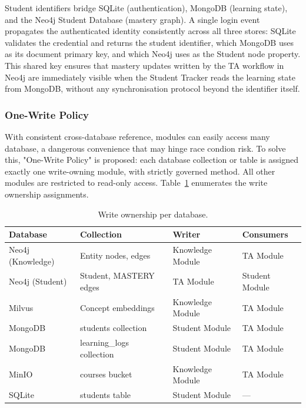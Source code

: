 Student identifiers bridge SQLite (authentication), MongoDB (learning state), and the Neo4j Student Database (mastery graph). 
A single login event propagates the authenticated identity consistently across all three stores: SQLite validates the credential 
and returns the student identifier, which MongoDB uses as its document primary key, and which Neo4j uses as the Student node 
property. This shared key ensures that mastery updates written by the TA workflow in Neo4j are immediately visible when the 
Student Tracker reads the learning state from MongoDB, without any synchronisation protocol beyond the identifier itself.

\subsubsection*{One-Write Policy}

With consistent cross-database reference, modules can easily access many database, a dangerous convenience that may hinge race condion risk. 
To solve this, "One-Write Policy" is proposed: 
each database collection or table is assigned exactly one write-owning module, with strictly governed method. All other modules 
are restricted to read-only access. Table~\ref{tab:write_policy} enumerates the write ownership assignments.

\begin{table}[H]
\centering
\caption{Write ownership per database.}
\label{tab:write_policy}
\renewcommand{\arraystretch}{1.2}
\begin{tabularx}{\textwidth}{|l|l|l|X|}
\hline
\textbf{Database} & \textbf{Collection} & \textbf{Writer} & \textbf{Consumers} \\ \hline
Neo4j (Knowledge) & Entity nodes, edges & Knowledge Module & TA Module \\ \hline
Neo4j (Student) & Student, MASTERY edges & TA Module & Student Module \\ \hline
Milvus & Concept embeddings & Knowledge Module & TA Module \\ \hline
MongoDB & students collection & Student Module & TA Module \\ \hline
MongoDB & learning\_logs collection & Student Module & TA Module \\ \hline
MinIO & courses bucket & Knowledge Module & TA Module \\ \hline
SQLite & students table & Student Module & --- \\ \hline
\end{tabularx}
\end{table}

